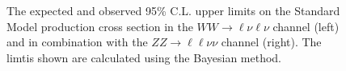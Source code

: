 \begin{figure}[!htbp]
\caption{The expected and observed 95\% C.L. upper limits on the
Standard Model production cross section in the $WW\rightarrow\ell\nu\ell\nu$ channel (left)
and in combination with the $ZZ\rightarrow\ell\ell\nu\nu$ channel (right).
The limtis shown are calculated using the Bayesian method.}
\label{fig:combinarion_bayes_fig}
%

\end{figure}
